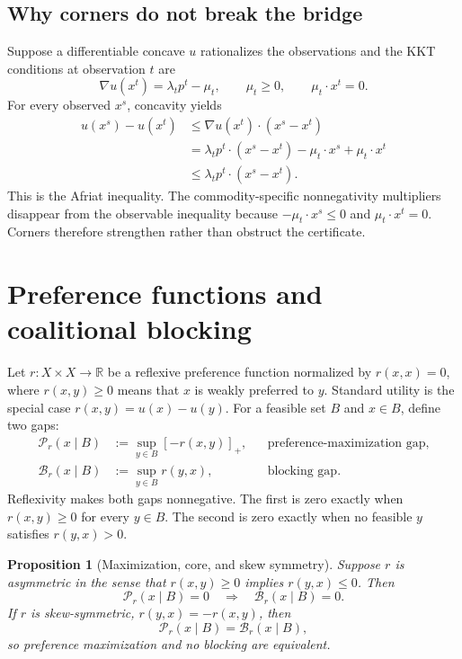 \documentclass[11pt]{article}
\newcommand{\R}{\mathbb{R}}
\newcommand{\B}{\mathcal{B}}
\newcommand{\cP}{\mathcal{P}}
\newcommand{\pos}[1]{\left[#1\right]_{+}}
\newtheorem{proposition}[theorem]{Proposition}
\theoremstyle{definition}
\theoremstyle{remark}
\begin{document}
\subsection{Why corners do not break the bridge}

Suppose a differentiable concave $u$ rationalizes the observations and the KKT conditions at
observation $t$ are
\begin{equation}
  \nabla u(x^t)=\lambda_tp^t-\mu_t,
  \qquad \mu_t\ge0,
  \qquad \mu_t\cdot x^t=0.
  \label{eq:kkt-corner}
\end{equation}
For every observed $x^s$, concavity yields
\begin{align}
  u(x^s)-u(x^t)
  &\le \nabla u(x^t)\cdot(x^s-x^t)\\
  &=\lambda_tp^t\cdot(x^s-x^t)
    -\mu_t\cdot x^s+\mu_t\cdot x^t\\
  &\le\lambda_tp^t\cdot(x^s-x^t).
  \label{eq:corner-afriat}
\end{align}
This is the Afriat inequality.  The commodity-specific nonnegativity multipliers disappear from
the observable inequality because $-\mu_t\cdot x^s\le0$ and $\mu_t\cdot x^t=0$.
Corners therefore strengthen rather than obstruct the certificate.

\section{Preference functions and coalitional blocking}

Let $r:X\times X\to\R$ be a reflexive preference function normalized by $r(x,x)=0$,
where $r(x,y)\ge0$ means that $x$ is weakly preferred to $y$.  Standard utility is the special
case $r(x,y)=u(x)-u(y)$.  For a feasible set $B$ and $x\in B$, define two gaps:
\begin{align}
  \cP_r(x\mid B)
  &:=\sup_{y\in B}\pos{-r(x,y)},
  &&\text{preference-maximization gap},
  \label{eq:preference-gap}\\
  \B_r(x\mid B)
  &:=\sup_{y\in B}r(y,x),
  &&\text{blocking gap}.
  \label{eq:blocking-gap}
\end{align}
Reflexivity makes both gaps nonnegative.  The first is zero exactly when
$r(x,y)\ge0$ for every $y\in B$.  The second is zero exactly when no feasible $y$ satisfies
$r(y,x)>0$.

\begin{proposition}[Maximization, core, and skew symmetry]
\label{prop:blocking}
Suppose $r$ is asymmetric in the sense that
$r(x,y)\ge0$ implies $r(y,x)\le0$.
Then
\[
  \cP_r(x\mid B)=0\quad\Longrightarrow\quad \B_r(x\mid B)=0.
\]
If $r$ is skew-symmetric, $r(y,x)=-r(x,y)$, then
\[
  \cP_r(x\mid B)=\B_r(x\mid B),
\]
so preference maximization and no blocking are equivalent.
\end{proposition}
\end{document}

